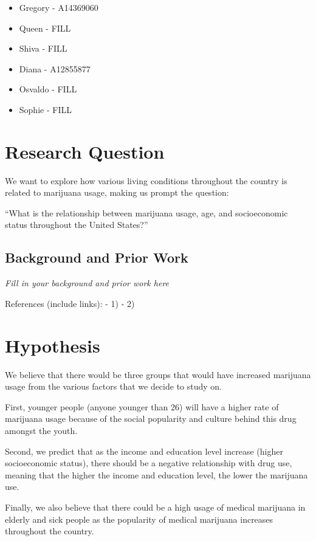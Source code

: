 \documentclass[11pt]{article}
\providecommand{\tightlist}{%
      \setlength{\itemsep}{0pt}\setlength{\parskip}{0pt}}
\begin{document}
\begin{itemize}
\tightlist
\item
  Gregory - A14369060
\item
  Queen - FILL
\item
  Shiva - FILL
\item
  Diana - A12855877
\item
  Osvaldo - FILL
\item
  Sophie - FILL
\end{itemize}

    \section{Research Question}\label{research-question}

    We want to explore how various living conditions throughout the country
is related to marijuana usage, making us prompt the question:

``What is the relationship between marijuana usage, age, and
socioeconomic status throughout the United States?''

    \subsection{Background and Prior Work}\label{background-and-prior-work}

    \emph{Fill in your background and prior work here}

References (include links): - 1) - 2)

    \section{Hypothesis}\label{hypothesis}

    We believe that there would be three groups that would have increased
marijuana usage from the various factors that we decide to study on.

First, younger people (anyone younger than 26) will have a higher rate
of marijuana usage because of the social popularity and culture behind
this drug amongst the youth.

Second, we predict that as the income and education level increase
(higher socioeconomic status), there should be a negative relationship
with drug use, meaning that the higher the income and education level,
the lower the marijuana use.

Finally, we also believe that there could be a high usage of medical
marijuana in elderly and sick people as the popularity of medical
marijuana increases throughout the country.
\end{document}
